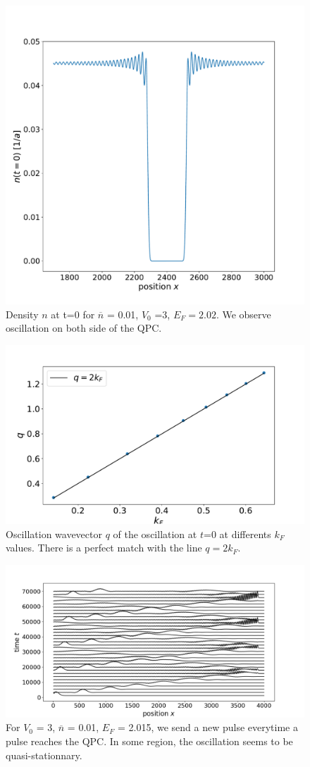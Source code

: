 \documentclass[aps,prl,preprint,groupedaddress]{revtex4-1}
\begin{document}
\begin{figure}
	\centering
	\includegraphics[width=0.7\linewidth]{../figures/oscillation_t0/plot_density_t0_Ef202}
	\caption{Density $n$ at t=0 for $\overline{n}$ = 0.01, $V_0$ =3, $E_F = 2.02$. We observe oscillation on both side of the QPC.}
	\label{fig:plotdensityt0ef202}
\end{figure}
\begin{figure}
	\centering
	\includegraphics[width=0.7\linewidth]{../figures/oscillation_t0/q_vs_kf_at_t0}
	\caption{Oscillation wavevector $q$ of the oscillation at $t$=0 at differents $k_F$ values. There is a perfect match with the line $q = 2k_F$.}
	
	

	\label{fig:qvskfatt0}
\end{figure}

\begin{figure}
	\centering
	\includegraphics[width=0.7\linewidth]{../figures/1dwire_manypulse/plot_manypulse_L5000_V030_Ef2015_u00_n001}
	\caption{For $V_0$ = 3, $\overline{n}$ = 0.01, $E_F$ = 2.015, we send a new pulse everytime a pulse reaches the QPC. In some region, the oscillation seems to be quasi-stationnary.  }	\label{fig:plotmanypulsel5000v03}
\end{figure}




\end{document}
